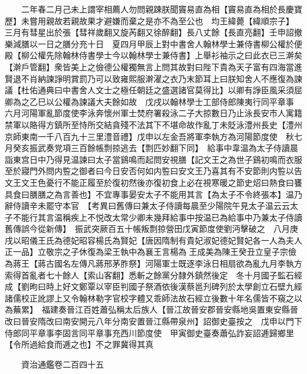 　　二年春二月己未上謂宰相薦人勿問親踈朕聞竇易直為相【竇易直為相於長慶寶歷】未嘗用親故若親故果才避嫌而棄之是亦不為至公也　均王緯薨【緯順宗子】　三月有彗星出於張【彗祥歲翻又旋芮翻又徐醉翻】長八丈餘【長直亮翻】壬申詔撤樂減膳以一日之膳分充十日　夏四月甲辰上對中書舍人翰林學士兼侍書柳公權於便殿【柳公權先除翰林侍書學士今以翰林學士兼侍書】上舉衫袖示之曰此衣已三澣矣【澣戶管翻】衆皆美上之儉德公權獨無言上問其故對曰陛下貴為天子富有四海當進賢退不肖納諫諍明賞罰乃可以致雍熙服澣濯之衣乃末節耳上曰朕知舍人不應復為諫議【杜佑通典曰中書舍人文士之極任朝廷之盛選諸官莫得比】以卿有諍臣風采須屈卿為之乙巳以公權為諫議大夫餘如故　戊戌以翰林學士工部侍郎陳夷行同平章事　六月河陽軍亂節度使李泳奔懷州軍士焚府署殺泳二子大掠數日乃止泳長安市人寓籍禁軍以賂得方鎮所至恃所交結貪殘不法其下不堪命故作亂丁未貶泳澧州長史【澧州京師東南一千八百九十三里澧音禮】戊申以左金吾將軍李執方為河陽節度使　秋七月癸亥振武奏党項三百餘帳剽掠逃去【剽匹妙翻下同】　給事中韋温為太子侍讀晨詣東宫日中乃得見温諫曰太子當鷄鳴而起問安視膳【記文王之為世子鷄初鳴而衣服至於寢門外問内䜿之御者曰今日安否何如内䜿曰安文王乃喜其有不安節則内䜿以告文王文王色憂行不能正履至於復初然後亦復初食上必在視寒暖之節史炤曰熱食曰饔具食曰膳膳之為言善也】不宜專事晏安太子不能用其言【為太子不令終張本】温乃辭侍讀辛未罷守本官　【考異曰舊傳曰兼太子侍讀每晨至少陽院午見太子温云云太子不能行其言温稱疾上不悦改太常少卿未幾拜給事中按温已為給事中乃兼太子侍讀舊傳誤今從新傳】　振武突厥百五十帳叛剽掠營田戊寅節度使劉沔擊破之　八月庚戌以昭儀王氏為德妃昭容楊氏為賢妃【唐因隋制有貴妃淑妃德妃賢妃各一人為夫人正一品】立敬宗之子休復為梁王執中為襄王言楊為王成美為陳王癸丑立皇子宗儉為蔣王【蔣古國名左傳凡蔣邢茅胙祭】河陽軍士既逐李泳日相扇欲為亂九月李執方索得首亂者七十餘人【索山客翻】悉斬之餘黨分隸外鎮然後定　冬十月國子監石經成【劉昫曰時上好文鄭覃以宰臣判國子祭酒依後漢蔡邕刋碑列於太學創立石壁九經諸儒校正訛謬上又令翰林勒字官校字體又乖師法故石經立後數十年名儒皆不窺之以為蕪累】　福建奏晉江百姓蕭弘稱太后族人【晉冮故晉安郡晉安縣地吳置東安縣晉改曰晉安隋改曰南安開元八年分南安置晉江縣帶泉州】詔御史臺按之　戊申以門下侍郎同平章事李固言同平章事充西川節度使　甲寅御史臺奏蕭弘詐妄詔逓歸鄉里【令所過給食而逓之也】不之罪冀得其真

　　資治通鑑卷二百四十五


    


 


 



 

 
  







